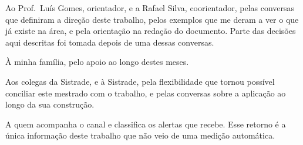 \begin{acknowledgements}
Ao Prof.\ Luís Gomes, orientador, e a Rafael Silva, coorientador, pelas conversas que
definiram a direção deste trabalho, pelos exemplos que me deram a ver o que já existe na
área, e pela orientação na redação do documento. Parte das decisões aqui descritas foi
tomada depois de uma dessas conversas.

À minha família, pelo apoio ao longo destes meses.

Aos colegas da Sistrade, e à Sistrade, pela flexibilidade que tornou possível conciliar
este mestrado com o trabalho, e pelas conversas sobre a aplicação ao longo da sua
construção.

A quem acompanha o canal e classifica os alertas que recebe. Esse retorno é a única
informação deste trabalho que não veio de uma medição automática.
\end{acknowledgements}

\tableofcontents
\cleardoublepage
{}
{}
\listoffigures
\cleardoublepage
{}
{}
\listoftables
\cleardoublepage
{}
{}
\lstlistoflistings

